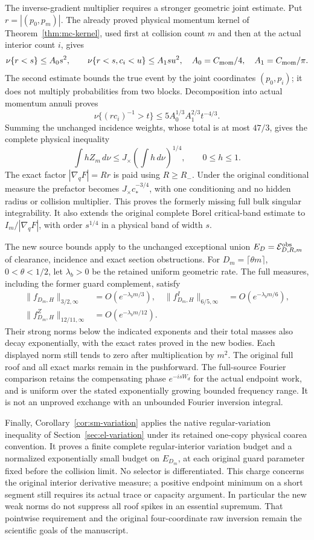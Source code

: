 The inverse-gradient multiplier requires a stronger geometric joint
estimate. Put $r=|(p_0,p_m)|$. The already proved physical momentum
kernel of Theorem~\ref{thm:mc-kernel}, used first at collision count
$m$ and then at the actual interior count $i$, gives
\[
 \nu\{r<s\}\le A_0s^2,\qquad
 \nu\{r<s,c_i<u\}\le A_1s u^2,
 \quad A_0=C_{\rm mom}/4,
 \quad A_1=C_{\rm mom}/\pi.
\]
The second estimate bounds the true event by the joint coordinates
$(p_0,p_i)$; it does not multiply probabilities from two blocks.
Decomposition into actual momentum annuli proves
\[
 \nu\{(r c_i)^{-1}>t\}
  \le5A_0^{1/3}A_1^{2/3}t^{-4/3}.
\]
Summing the unchanged incidence weights, whose total is at most $47/3$,
gives the complete physical inequality
\[
 \int hZ_m\,d\nu
       \le J_\times\left(\int h\,d\nu\right)^{1/4},
 \qquad 0\le h\le1.
\]
The exact factor $|\nabla_qF|=Rr$ is paid using $R\ge R_-$.
Under the original conditional measure the prefactor becomes
$J_\times c_*^{-3/4}$, with one conditioning and no hidden radius
or collision multiplier. This proves the formerly missing full bulk
singular integrability. It also extends the original complete Borel
critical-band estimate to $I_m/|\nabla_qF|$, with order $s^{1/4}$
in a physical band of width $s$.

The new source bounds apply to the unchanged exceptional union
$E_D=\mathcal E^{\rm obs}_{D,R,m}$ of clearance, incidence and exact
section obstructions. For $D_m=\lceil\theta m\rceil$,
$0<\theta<1/2$, let $\lambda_b>0$ be the retained uniform geometric
rate. The full measures, including the former guard complement, satisfy
\begin{align*}
 \|f_{D_m,H}\|_{3/2,\infty}&=O(e^{-\lambda_bm/3}),&
 \|f^I_{D_m,H}\|_{6/5,\infty}&=O(e^{-\lambda_bm/6}),\\
 \|f^Z_{D_m,H}\|_{12/11,\infty}&=O(e^{-\lambda_bm/12}).
\end{align*}
Their strong norms below the indicated exponents and their total masses
also decay exponentially, with the exact rates proved in the new bodies.
Each displayed norm still tends to zero after multiplication by $m^2$.
The original full roof and all exact marks remain in the pushforward.
The full-source Fourier comparison retains the compensating phase
$e^{-isW_d}$ for the actual endpoint work, and is uniform over the
stated exponentially growing bounded frequency range. It is not an
unproved exchange with an unbounded Fourier inversion integral.

Finally, Corollary~\ref{cor:sm-variation} applies the native
regular-variation inequality of Section~\ref{sec:el-variation}
under its retained one-copy physical coarea convention. It proves a
finite complete regular-interior variation budget and a normalized
exponentially small budget on $E_{D_m}$, at each original guard
parameter fixed before the collision limit. No selector is differentiated.
This charge concerns the original interior derivative measure; a positive
endpoint minimum on a short segment still requires its actual trace or
capacity argument. In particular the new weak norms do not suppress
all roof spikes in an essential supremum. That pointwise requirement
and the original four-coordinate raw inversion remain the scientific
goals of the manuscript.
